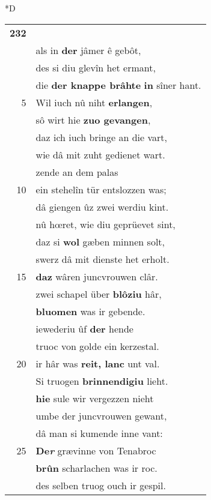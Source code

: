 \documentclass[8pt,a4paper,notitlepage]{article}
\begin{document}
\begin{table}[ht]
\begin{minipage}[t]{0.5\linewidth}
\small
\begin{center}*D
\end{center}
\begin{tabular}{rl}
\textbf{232} & \textit{\begin{large}G\end{large}}estillet \textbf{was} des volkes nôt,\\ 
 & als in \textbf{der} jâmer ê gebôt,\\ 
 & des si diu glevîn het ermant,\\ 
 & die \textbf{der knappe brâhte} \textbf{in} sîner hant.\\ 
5 & Wil iuch nû niht \textbf{erlangen},\\ 
 & sô wirt hie \textbf{zuo gevangen},\\ 
 & daz ich iuch bringe an die vart,\\ 
 & wie dâ mit zuht gedienet wart.\\ 
 & zende an dem palas\\ 
10 & ein stehelîn tür entslozzen was;\\ 
 & dâ giengen ûz zwei werdiu kint.\\ 
 & nû hœret, wie diu geprüevet sint,\\ 
 & daz si \textbf{wol} gæben minnen solt,\\ 
 & swerz dâ mit dienste het erholt.\\ 
15 & \textbf{daz} wâren juncvrouwen clâr.\\ 
 & zwei schapel über \textbf{blôziu} hâr,\\ 
 & \textbf{bluomen} was ir gebende.\\ 
 & iewederiu ûf \textbf{der} hende\\ 
 & truoc von golde ein kerzestal.\\ 
20 & ir hâr was \textbf{reit, lanc} unt val.\\ 
 & Si truogen \textbf{brinnendigiu} lieht.\\ 
 & \textbf{hie} sule wir vergezzen nieht\\ 
 & umbe der juncvrouwen gewant,\\ 
 & dâ man si kumende inne vant:\\ 
25 & \textbf{De\textit{r}} grævinne von Tenabroc\\ 
 & \textbf{brûn} scharlachen was ir roc.\\ 
 & des selben truog ouch ir gespil.\\ 

\end{tabular}
\end{minipage}
\end{table}
\end{document}
